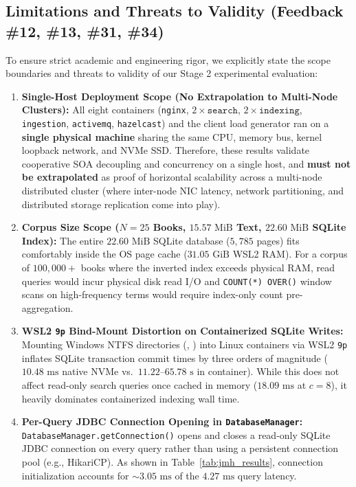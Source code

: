 \documentclass[10pt,a4paper]{article}
\begin{document}
\subsection{Limitations and Threats to Validity (Feedback \#12, \#13, \#31, \#34)}
\label{subsec:limitations}

To ensure strict academic and engineering rigor, we explicitly state the scope boundaries and threats to validity of our Stage 2 experimental evaluation:
\begin{enumerate}[leftmargin=*,nosep]
    \item \textbf{Single-Host Deployment Scope (No Extrapolation to Multi-Node Clusters):} All eight containers (\texttt{nginx}, $2\times\texttt{search}$, $2\times\texttt{indexing}$, \texttt{ingestion}, \texttt{activemq}, \texttt{hazelcast}) and the client load generator ran on a \textbf{single physical machine} sharing the same CPU, memory bus, kernel loopback network, and NVMe SSD. Therefore, these results validate cooperative SOA decoupling and concurrency on a single host, and \textbf{must not be extrapolated} as proof of horizontal scalability across a multi-node distributed cluster (where inter-node NIC latency, network partitioning, and distributed storage replication come into play).
    \item \textbf{Corpus Size Scope ($N = 25$ Books, $15.57\text{ MiB}$ Text, $22.60\text{ MiB}$ SQLite Index):} The entire $22.60\text{ MiB}$ SQLite database ($5,785$ pages) fits comfortably inside the OS page cache ($31.05\text{ GiB}$ WSL2 RAM). For a corpus of $100,000+$ books where the inverted index exceeds physical RAM, read queries would incur physical disk read I/O and \texttt{COUNT(*) OVER()} window scans on high-frequency terms would require index-only count pre-aggregation.
    \item \textbf{WSL2 \texttt{9p} Bind-Mount Distortion on Containerized SQLite Writes:} Mounting Windows NTFS directories (, ) into Linux containers via WSL2 \texttt{9p} inflates SQLite transaction commit times by three orders of magnitude ($10.48\text{ ms}$ native NVMe vs.\ $11.22\text{--}65.78\text{ s}$ in container). While this does not affect read-only search queries once cached in memory ($18.09\text{ ms}$ at $c=8$), it heavily dominates containerized indexing wall time.
    \item \textbf{Per-Query JDBC Connection Opening in \texttt{DatabaseManager}:} \texttt{DatabaseManager.getConnection()} opens and closes a read-only SQLite JDBC connection on every query rather than using a persistent connection pool (e.g., HikariCP). As shown in Table~\ref{tab:jmh_results}, connection initialization accounts for $\sim 3.05\text{ ms}$ of the $4.27\text{ ms}$ query latency.

\end{enumerate}
\end{document}
